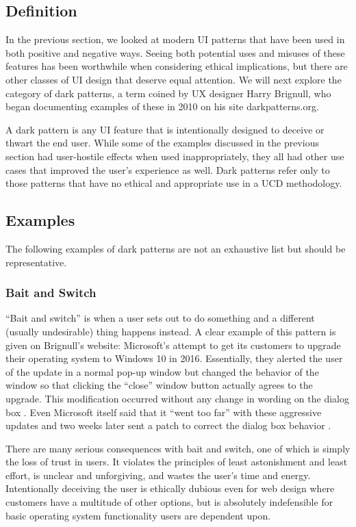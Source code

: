 \documentclass[12pt, oneside]{article}
\begin{document}
\subsection{Definition}

In the previous section, we looked at modern UI patterns that have been used in both positive and negative ways. Seeing both potential uses and misuses of these features has been worthwhile when considering ethical implications, but there are other classes of UI design that deserve equal attention. We will next explore the category of dark patterns, a term coined by UX designer Harry Brignull, who began documenting examples of these in 2010 on his site darkpatterns.org.

A dark pattern is any UI feature that is intentionally designed to deceive or thwart the end user. While some of the examples discussed in the previous section had user-hostile effects when used inappropriately, they all had other use cases that improved the user's experience as well. Dark patterns refer only to those patterns that have no ethical and appropriate use in a UCD methodology.

\subsection{Examples}

The following examples of dark patterns are not an exhaustive list but should be representative.

\subsubsection{Bait and Switch}

``Bait and switch'' is when a user sets out to do something and a different (usually undesirable) thing happens instead. A clear example of this pattern is given on Brignull's website: Microsoft's attempt to get its customers to upgrade their operating system to Windows 10 in 2016. Essentially, they alerted the user of the update in a normal pop-up window but changed the behavior of the window so that clicking the ``close'' window button actually agrees to the upgrade. This modification occurred without any change in wording on the dialog box \cite{thurrott_2016}. Even Microsoft itself said that it ``went too far'' with these aggressive updates and two weeks later sent a patch to correct the dialog box behavior \cite{popa_2016}.

There are many serious consequences with bait and switch, one of which is simply the loss of trust in users. It violates the principles of least astonishment and least effort, is unclear and unforgiving, and wastes the user's time and energy. Intentionally deceiving the user is ethically dubious even for web design where customers have a multitude of other options, but is absolutely indefensible for basic operating system functionality users are dependent upon.
\end{document}
